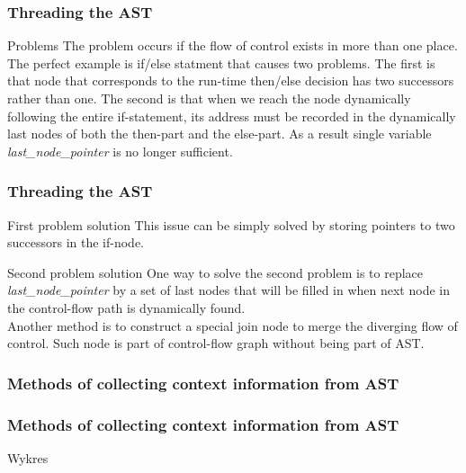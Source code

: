 \documentclass[presentation]{beamer}
\begin{document}
\begin{frame}
  \frametitle{Threading the AST}
  \begin{block}{Problems}
  The problem occurs if the flow of control exists in more than one place. The perfect example is if/else statment that causes two problems. The first is that node that corresponds to the run-time then/else decision has two successors rather than one. The second is that when we reach the node dynamically following the entire if-statement, its address must be recorded in the dynamically last nodes of both the then-part and the else-part. As a result single variable \emph{last\_node\_pointer} is no longer sufficient.
  \end{block}
  
\end{frame}

\begin{frame}
  \frametitle{Threading the AST}
  \begin{block}{First problem solution}
  This issue can be simply solved  by storing pointers to two successors in the if-node.
  \end{block}
  
  \begin{block}{Second problem solution}
  One way to solve the second problem is to replace \emph{last\_node\_pointer} by a set of last nodes that will be filled in when next node in the control-flow path is dynamically found.\\
  Another method is to construct a special join node to merge the diverging flow of control. Such node is part of control-flow graph without being part of AST.
  \end{block}
  
\end{frame}

\begin{frame}
  \frametitle{Methods of collecting context information from AST}
  
  
  
\end{frame}

\begin{frame}
  \frametitle{Methods of collecting context information from AST}
  
  \begin{alertblock}{Wykres}

    \end{alertblock}
  
\end{frame}
\end{document}

